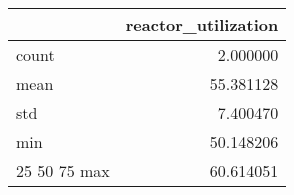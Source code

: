 \begin{tabular}{lr}
\toprule
 & reactor\_utilization \\
\midrule
count & 2.000000 \\
mean & 55.381128 \\
std & 7.400470 \\
min & 50.148206 \\
25%
50%
75%
max & 60.614051 \\
\bottomrule
\end{tabular}


